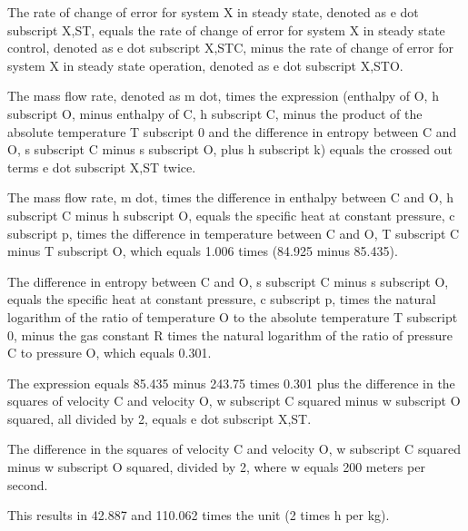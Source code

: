 The rate of change of error for system X in steady state, denoted as e dot subscript X,ST, equals the rate of change of error for system X in steady state control, denoted as e dot subscript X,STC, minus the rate of change of error for system X in steady state operation, denoted as e dot subscript X,STO.

The mass flow rate, denoted as m dot, times the expression (enthalpy of O, h subscript O, minus enthalpy of C, h subscript C, minus the product of the absolute temperature T subscript 0 and the difference in entropy between C and O, s subscript C minus s subscript O, plus h subscript k) equals the crossed out terms e dot subscript X,ST twice.

The mass flow rate, m dot, times the difference in enthalpy between C and O, h subscript C minus h subscript O, equals the specific heat at constant pressure, c subscript p, times the difference in temperature between C and O, T subscript C minus T subscript O, which equals 1.006 times (84.925 minus 85.435).

The difference in entropy between C and O, s subscript C minus s subscript O, equals the specific heat at constant pressure, c subscript p, times the natural logarithm of the ratio of temperature O to the absolute temperature T subscript 0, minus the gas constant R times the natural logarithm of the ratio of pressure C to pressure O, which equals 0.301.

The expression equals 85.435 minus 243.75 times 0.301 plus the difference in the squares of velocity C and velocity O, w subscript C squared minus w subscript O squared, all divided by 2, equals e dot subscript X,ST.

The difference in the squares of velocity C and velocity O, w subscript C squared minus w subscript O squared, divided by 2, where w equals 200 meters per second.

This results in 42.887 and 110.062 times the unit (2 times h per kg).